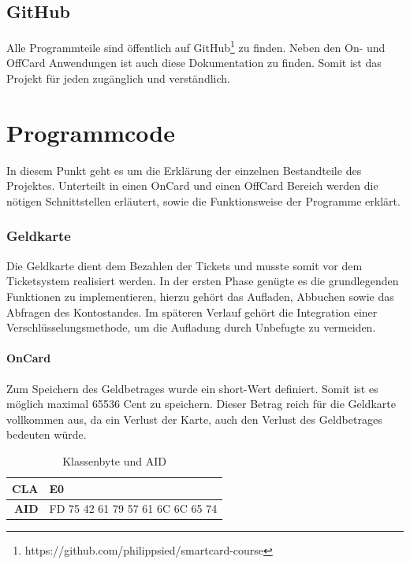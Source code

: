 \documentclass[	a4paper,
			11pt,
			oneside,
			parskip]{scrartcl}
\begin{document}
\subsection{GitHub}

Alle Programmteile sind öffentlich auf GitHub\footnote{https://github.com/philippsied/smartcard-course} zu finden. Neben den On- und OffCard Anwendungen ist auch diese Dokumentation  zu finden. Somit ist das Projekt für jeden zugänglich und verständlich.

\section{Programmcode}

In diesem Punkt geht es um die Erklärung der einzelnen Bestandteile des Projektes. Unterteilt in einen OnCard und einen OffCard Bereich werden die nötigen Schnittstellen erläutert, sowie die Funktionsweise der Programme erklärt. 

\subsubsection{Geldkarte}

Die Geldkarte dient dem Bezahlen der Tickets und musste somit vor dem Ticketsystem realisiert werden. In der ersten Phase genügte es die grundlegenden Funktionen zu implementieren, hierzu gehört das Aufladen, Abbuchen sowie das Abfragen des Kontostandes. Im späteren Verlauf gehört die Integration einer Verschlüsselungsmethode, um die Aufladung durch Unbefugte zu vermeiden.

\paragraph{OnCard} Zum Speichern des Geldbetrages wurde ein short-Wert definiert. Somit ist es möglich maximal 65536 Cent zu speichern. Dieser Betrag reich für die Geldkarte vollkommen aus, da ein Verlust der Karte, auch den Verlust des Geldbetrages bedeuten würde.

\begin{table}[H]
  \centering
  \caption{Klassenbyte und AID}
    \begin{tabular}{rr}
    \toprule
    \textbf{CLA} & \multicolumn{1}{l}{E0} \\
    \midrule
    \textbf{AID} & FD 75 42 61 79 57 61 6C 6C 65 74 \\
    \bottomrule
    \end{tabular}%
  \label{tab:walletaid}%
\end{table}%
\end{document}
